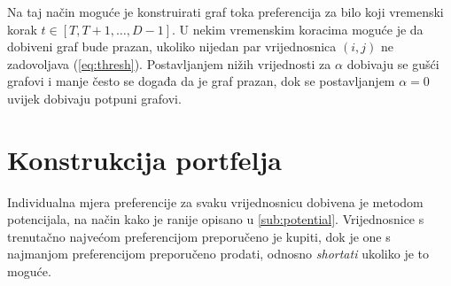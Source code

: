 \documentclass[lmodern, utf8, diplomski, numeric]{fer}
\begin{document}
  Na taj način moguće je konstruirati graf toka preferencija za bilo koji vremenski korak $t \in \left[T, T + 1, \ldots, D-1\right]$.
  U nekim vremenskim koracima moguće je da dobiveni graf bude prazan, ukoliko nijedan par vrijednosnica $(i,j)$ ne zadovoljava (\ref{eq:thresh}).
  Postavljanjem nižih vrijednosti za $\alpha$ dobivaju se gušći grafovi i manje često se događa da je graf prazan, dok se postavljanjem $\alpha = 0$ uvijek dobivaju potpuni grafovi.
  
  \section{Konstrukcija portfelja}
  Individualna mjera preferencije za svaku vrijednosnicu dobivena je metodom potencijala, na način kako je ranije opisano u \ref{sub:potential}.
  Vrijednosnice s trenutačno najvećom preferencijom preporučeno je kupiti, dok je one s najmanjom preferencijom preporučeno prodati, odnosno \textit{shortati} ukoliko je to moguće.
  
\end{document}
